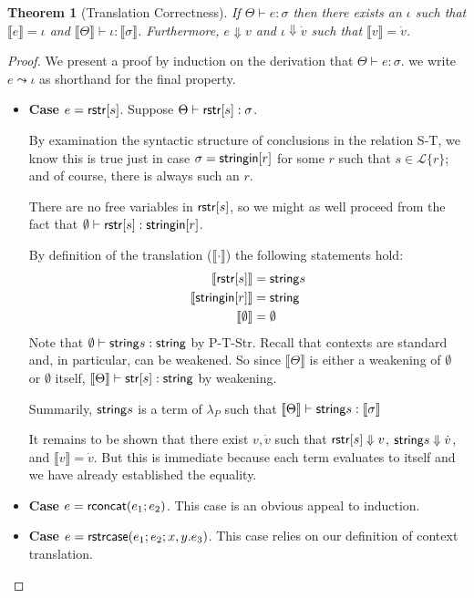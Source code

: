 \documentclass[12pt]{article}
\newtheorem{thm}{Theorem}
\theoremstyle{definition}
\newcommand{\Lagr}{\mathcal{L}}
\newcommand{\lang}[1]{\Lagr\{#1\}}
\newcommand{\lambdap}{\lambda_P}
\newcommand{\stringin}[1]{{\sf stringin}[#1]}
\renewcommand{\tstr}[1]{{{\sf str}[#1]}}
\newcommand{\str}{{\sf string}}
\newcommand{\tctx}{\Theta} %
\newcommand{\strcase}[3]{ {\sf rstrcase}(#1; #2; #3)}
\newcommand{\trden}[1]{\llbracket #1 \rrbracket} %
\newcommand{\treduces}{ \Downarrow }
\newcommand{\sreduces}{ \Downarrow }
\begin{document}
\begin{thm}[Translation Correctness]\label{thm:trcorrect}
  If $\tctx \vdash e : \sigma$ then 
  there exists an $\iota$ such that $\trden{e} = \iota$
  and $\trden{\tctx} \vdash \iota : \trden{\sigma}$.
  Furthermore, $e \sreduces v$ and
  $\iota \treduces \dot{v}$ such that
  $\trden{v} = \dot{v}$.
\end{thm}
\begin{proof}
We present a proof by induction on the derivation that $\tctx \vdash e : \sigma$.
we write $e \leadsto \iota$ as shorthand for the final property.

\begin{itemize}[label=$ $, itemsep=1ex]
\item \textbf{Case $e = {\sf rstr}[s]$}. Suppose $\tctx \vdash \rstr{s} : \sigma$.

By examination the syntactic structure of conclusions in the relation S-T, 
we know this is true just in case $\sigma = \stringin{r}$ for some $r$ such that
$s \in \lang{r}$; and of course, there is always such an $r$.

There are no free variables in ${\sf rstr}[s]$, so we might as well proceed from the
fact that $\emptyset \vdash \rstr{s} : \stringin{r}$.

By definition of the translation ($\trden{\cdot}$) the following statements hold:
\begin{align}
\trden{\rstr{s}} &= \str{s} \\
\trden{\stringin{r}} &= \str \\
\trden{\emptyset} &= \emptyset
\end{align}
Note that $\emptyset \vdash \str{s} : \str$ by P-T-Str.
Recall that contexts are standard and, in particular, can be weakened.
So since $\trden{\tctx}$ is either a weakening of $\emptyset$ or $\emptyset$ itself,
$\trden{\tctx} \vdash \tstr{s} : \str$ by weakening.

Summarily, $\str{s}$ is a term of $\lambdap$ such that $\trden{\tctx} \vdash \str{s} : \trden{\sigma}$

It remains to be shown that there exist $v, \dot{v}$ such that $\rstr{s} \sreduces v$,
$\str{s} \treduces \dot{v}$, and $\trden{v} = \dot{v}$. But this is immediate because
each term evaluates to itself and we have already established the equality.

\item \textbf{Case $e = {\sf rconcat}(e_1;e_2)$}. This case is an obvious appeal to induction.

\item \textbf{Case $e = \strcase{e_1}{e_2}{x,y.e_3}$}. This case relies on our definition
of context translation.


\end{itemize}
\end{proof}
\end{document}
